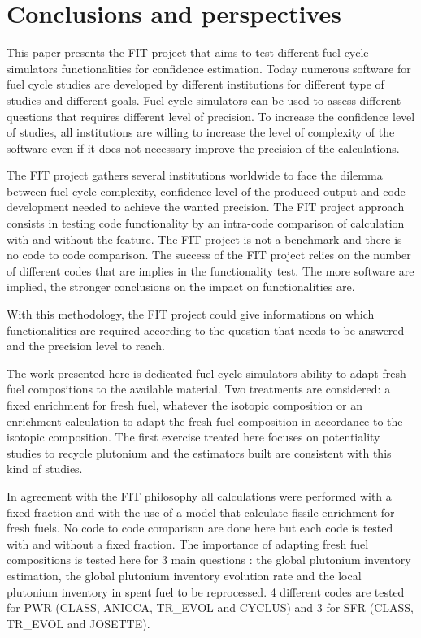 \section{Conclusions and perspectives}

This paper presents the FIT project that aims to test different fuel cycle simulators functionalities for confidence estimation. Today numerous software for fuel cycle studies are developed by different institutions for different type of studies and different goals. Fuel cycle simulators can be used to assess different questions that requires different level of precision. To increase the confidence level of studies, all institutions are willing to increase the level of complexity of the software even if it does not necessary improve the precision of the calculations. 

The FIT project gathers several institutions worldwide to face the dilemma between fuel cycle complexity, confidence level of the produced output and code development needed to achieve the wanted precision. The FIT project approach consists in testing code functionality by an intra-code comparison of calculation with and without the feature. The FIT project is not a benchmark and there is no code to code comparison. The success of the FIT project relies on the number of different codes that are implies in the functionality test. The more software are implied, the stronger conclusions on the impact on functionalities are.   

With this methodology, the FIT project could give informations on which functionalities are required according to the question that needs to be answered and the precision level to reach.

The work presented here is dedicated fuel cycle simulators ability to adapt fresh fuel compositions to the available material. Two treatments are considered: a fixed enrichment for fresh fuel, whatever the isotopic composition or an enrichment calculation to adapt the fresh fuel composition in accordance to the isotopic composition. The first exercise treated here focuses on potentiality studies to recycle plutonium and the estimators built are consistent with this kind of studies.  

In agreement with the FIT philosophy all calculations were performed with a fixed fraction and with the use of a model that calculate fissile enrichment for fresh fuels. No code to code comparison are done here but each code is tested with and without a fixed fraction. The importance of adapting fresh fuel compositions is tested here for 3 main questions : the global plutonium inventory estimation, the global plutonium inventory evolution rate and the local plutonium inventory in spent fuel to be reprocessed. 4 different codes are tested for PWR (CLASS, ANICCA, TR\_EVOL and CYCLUS) and 3 for SFR (CLASS, TR\_EVOL and JOSETTE). 

